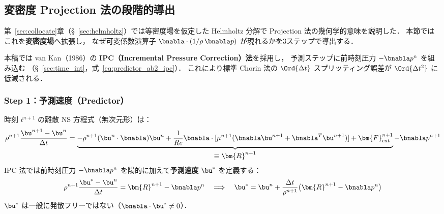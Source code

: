 \label{sec:pressure}%

\subsection{変密度 Projection 法の段階的導出}
\label{sec:projection_derivation}

第~\ref{sec:collocate}章（§~\ref{sec:helmholtz}）では等密度場を仮定した Helmholtz 分解で
Projection 法の幾何学的意味を説明した．
本節ではこれを\textbf{変密度場}へ拡張し，
なぜ可変係数演算子 $\bnabla\cdot(1/\rho\,\bnabla p)$ が現れるかを3ステップで導出する．

本稿では van Kan（1986）の \textbf{IPC（Incremental Pressure Correction）法}を採用し，
予測ステップに前時刻圧力 $-\bnabla p^n$ を組み込む
（§~\ref{sec:time_int}，式~\eqref{eq:predictor_ab2_ipc}）．
これにより標準 Chorin 法の $\Ord{\Delta t}$ スプリッティング誤差が $\Ord{\Delta t^2}$ に低減される．

\subsubsection{Step 1：予測速度（Predictor）}

時刻 $t^{n+1}$ の離散 NS 方程式（無次元形）は：
\begin{equation}
  \rho^{n+1}\frac{\bu^{n+1} - \bu^n}{\Delta t}
  = \underbrace{-\rho^{n+1}(\bu^n\cdot\bnabla)\bu^n
    + \frac{1}{Re}\bnabla\cdot[\mu^{n+1}(\bnabla\bu^{n+1}+\bnabla^T\bu^{n+1})]
    + \bm{F}_\text{ext}^{n+1}}_{\displaystyle \equiv \bm{R}^{n+1}}
  - \bnabla p^{n+1}
  \label{eq:NS_full}
\end{equation}
IPC 法では前時刻圧力 $-\bnabla p^n$ を陽的に加えて\textbf{予測速度} $\bu^*$ を定義する：
\begin{equation}
  \rho^{n+1}\frac{\bu^* - \bu^n}{\Delta t} = \bm{R}^{n+1} - \bnabla p^n
  \quad\Longrightarrow\quad
  \bu^* = \bu^n + \frac{\Delta t}{\rho^{n+1}}\bigl(\bm{R}^{n+1} - \bnabla p^n\bigr)
  \label{eq:predictor}
\end{equation}
$\bu^*$ は一般に発散フリーではない（$\bnabla\cdot\bu^* \neq 0$）．

